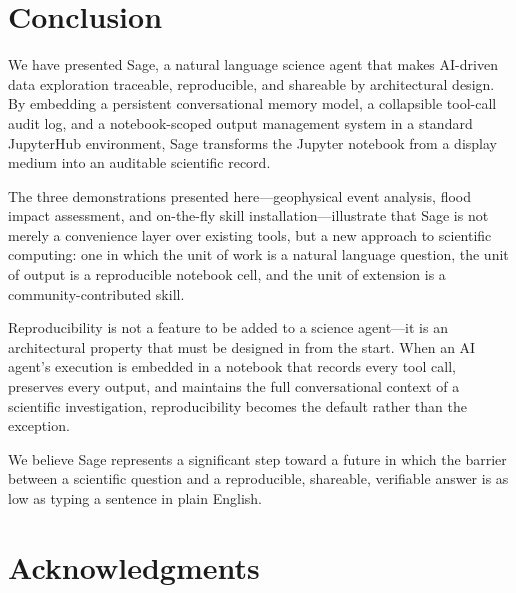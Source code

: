 \documentclass[10pt,twocolumn]{article}
\begin{document}
\section{Conclusion}

We have presented Sage, a natural language science agent that makes AI-driven data exploration traceable, reproducible, and shareable by architectural design. By embedding a persistent conversational memory model, a collapsible tool-call audit log, and a notebook-scoped output management system in a standard JupyterHub environment, Sage transforms the Jupyter notebook from a display medium into an auditable scientific record.

The three demonstrations presented here---geophysical event analysis, flood impact assessment, and on-the-fly skill installation---illustrate that Sage is not merely a convenience layer over existing tools, but a new approach to scientific computing: one in which the unit of work is a natural language question, the unit of output is a reproducible notebook cell, and the unit of extension is a community-contributed skill.

Reproducibility is not a feature to be added to a science agent---it is an architectural property that must be designed in from the start. When an AI agent's execution is embedded in a notebook that records every tool call, preserves every output, and maintains the full conversational context of a scientific investigation, reproducibility becomes the default rather than the exception.

We believe Sage represents a significant step toward a future in which the barrier between a scientific question and a reproducible, shareable, verifiable answer is as low as typing a sentence in plain English.

\section*{Acknowledgments}

\end{document}
